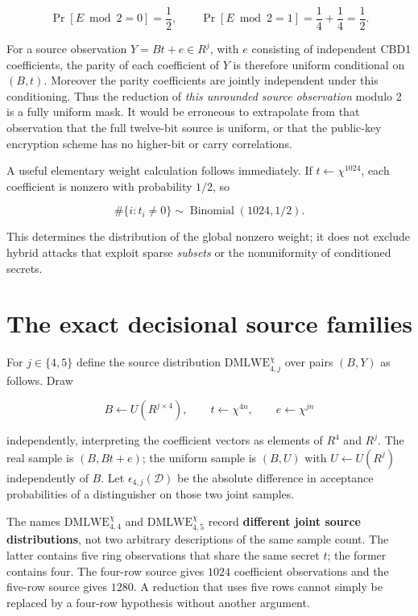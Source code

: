 \documentclass[
  11pt,
  a4paper,
  oneside]{report}
\begin{document}
\[
\Pr[E\bmod2=0]=\frac12,
\qquad \Pr[E\bmod2=1]=\frac14+\frac14=\frac12.
\]

For a source observation \(Y=Bt+e\in R^j\), with \(e\) consisting of
independent CBD1 coefficients, the parity of each coefficient of \(Y\)
is therefore uniform conditional on \((B,t)\). Moreover the parity
coefficients are jointly independent under this conditioning. Thus the
reduction of \emph{this unrounded source observation} modulo 2 is a
fully uniform mask. It would be erroneous to extrapolate from that
observation that the full twelve-bit source is uniform, or that the
public-key encryption scheme has no higher-bit or carry correlations.

A useful elementary weight calculation follows immediately. If
\(t\leftarrow\chi^{1024}\), each coefficient is nonzero with probability
\(1/2\), so

\[
\#\{i:t_i\ne0\}\sim\operatorname{Binomial}(1024,1/2).
\]

This determines the distribution of the global nonzero weight; it does
not exclude hybrid attacks that exploit sparse \emph{subsets} or the
nonuniformity of conditioned secrets.

\section{The exact decisional source
families}\label{the-exact-decisional-source-families}

For \(j\in\{4,5\}\) define the source distribution
\(\mathrm{DMLWE}_{4,j}^{\chi}\) over pairs \((B,Y)\) as follows. Draw

\[
B\leftarrow U(R^{j\times4}),\qquad
 t\leftarrow\chi^{4n},\qquad
 e\leftarrow\chi^{jn}
\]

independently, interpreting the coefficient vectors as elements of
\(R^4\) and \(R^j\). The real sample is \((B,Bt+e)\); the uniform sample
is \((B,U)\) with \(U\leftarrow U(R^j)\) independently of \(B\). Let
\(\epsilon_{4,j}(\mathcal D)\) be the absolute difference in acceptance
probabilities of a distinguisher on those two joint samples.

The names \(\mathrm{DMLWE}_{4,4}^{\chi}\) and
\(\mathrm{DMLWE}_{4,5}^{\chi}\) record \textbf{different joint source
distributions}, not two arbitrary descriptions of the same sample count.
The latter contains five ring observations that share the same secret
\(t\); the former contains four. The four-row source gives \(1024\)
coefficient observations and the five-row source gives \(1280\). A
reduction that uses five rows cannot simply be replaced by a four-row
hypothesis without another argument.
\end{document}
